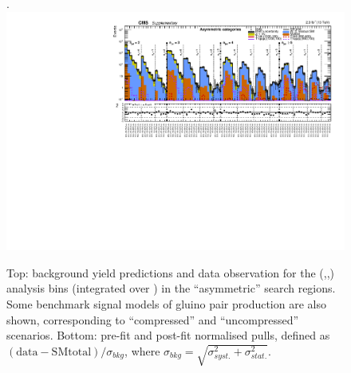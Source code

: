 \clearpage
\begin{landscape}
  \begin{center}
    \begin{figure}[h!]
      \caption{Top: background yield predictions and data observation for the (\njet,\nb,\scalht) analysis bins (integrated over \mht) in the ``asymmetric'' search regions. Some benchmark signal models of gluino pair production are also shown, corresponding to ``compressed'' and ``uncompressed'' scenarios. Bottom: pre-fit and post-fit normalised pulls, defined as $(\mathrm{data}-\mathrm{SM total})/\sigma_{bkg}$, where $\sigma_{bkg}=\sqrt{\sigma^{2}_{syst.}+\sigma^{2}_{stat.}}$. \label{fig:summaryPlot_Asymmetric}}.
      \includegraphics[width=0.8\linewidth]{supplementary/figures/summaryPlot_Asymmetric_prefit_overlay_fit_b}
    \end{figure}
  \end{center}
\end{landscape}

